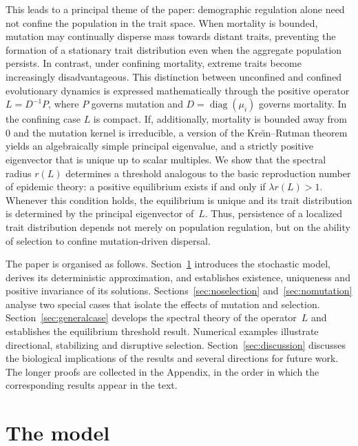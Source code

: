 \documentclass[12pt]{article}
\begin{document}
This leads to a principal theme of the paper: demographic regulation
alone need not confine the population in the trait space. When mortality
is bounded, mutation may continually disperse mass towards distant
traits, preventing the formation of a stationary trait distribution even
when the aggregate population persists. In contrast, under confining
mortality, extreme traits become increasingly disadvantageous. This
distinction between unconfined and confined evolutionary dynamics is
expressed mathematically through the positive operator $L=D^{-1}P$,
where $P$ governs mutation and $D=\operatorname{diag}(\mu_i)$ governs
mortality. In the confining case $L$ is compact. If, additionally,
mortality is bounded away from $0$ and the mutation kernel is
irreducible, a version of the Kre\u{\i}n--Rutman theorem yields an
algebraically simple principal eigenvalue, and a strictly positive
eigenvector that is unique up to scalar multiples. We show that the
spectral radius $r(L)$ determines a threshold analogous to the basic
reproduction number of epidemic theory: a positive equilibrium exists if
and only if $\lambda r(L)>1$. Whenever this condition holds, the
equilibrium is unique and its trait distribution is determined by the
principal eigenvector of~$L$. Thus, persistence of a localized trait
distribution depends not merely on population regulation, but on the
ability of selection to confine mutation-driven dispersal.

The paper is organised as follows. Section~\ref{sec:model} introduces
the stochastic model, derives its deterministic approximation, and
establishes existence, uniqueness and positive invariance of its
solutions. Sections~\ref{sec:noselection} and~\ref{sec:nomutation}
analyse two special cases that isolate the effects of mutation and
selection. Section~\ref{sec:generalcase} develops the spectral theory of
the operator~$L$ and establishes the equilibrium threshold result.
Numerical examples illustrate directional, stabilizing and disruptive
selection. Section~\ref{sec:discussion} discusses the biological
implications of the results and several directions for future work.
The longer proofs are collected in the Appendix, in the order in which 
the corresponding results appear in the text.

\section{The model}
\label{sec:model}
\end{document}
